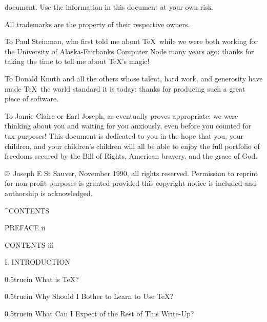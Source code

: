 document. Use the information in this document at your own risk.
\bigskip\bigskip\par\noindent
{}
\bigskip\par\noindent
All trademarks are the property of their respective owners. 
\bigskip\bigskip\par\noindent
{}
\bigskip\par\noindent
To Paul Steinman, who first told me about \TeX\ while we were both working
for the University of Alaska-Fairbanks Computer Node many years ago: thanks 
for taking the time to tell me about \TeX{}'s magic!
\bigskip\par\noindent
To Donald Knuth and all the others whose talent, hard work, and
generosity have made \TeX\ the world standard it is today: 
thanks for producing such a great piece of software.
\bigskip\bigskip\par\noindent
{}
\bigskip\par\noindent
To Jamie Claire or Earl Joseph, as eventually proves appropriate: we were thinking about you and waiting for you anxiously, even before you counted 
for tax purposes! This document is dedicated to you in the hope that you, 
your children, and your children's children will all be able to enjoy 
the full portfolio of freedoms secured by the Bill of Rights, American
bravery, and the grace of God.
\bigskip\bigskip\par\noindent
{}
\bigskip\par\noindent
\copyright\ Joseph E St Sauver, November 1990, all rights reserved. 
Permission to reprint for non-profit purposes is granted provided 
this copyright notice is included and authorship is acknowledged. 
\vfill\eject
\centerline{\twlbf ^{CONTENTS}}
\bigskip\par\noindent
PREFACE \leaderfill\quad ii
\bigskip\par\noindent
CONTENTS \leaderfill\quad iii
\bigskip\par\noindent
I. INTRODUCTION
\medskip\par\hglue 0.5truein
What is \TeX? \leaderfill{}
\par\hglue 0.5truein
Why Should I Bother to Learn to Use \TeX? \leaderfill{}
\par\hglue 0.5truein
What Can I Expect of the Rest of This Write-Up? \leaderfill{}
\bigskip\par\noindent
